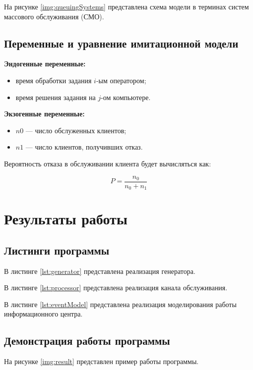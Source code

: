\documentclass{bmstu}
\begin{document}
На рисунке \ref{img:queuingSystems} представлена схема модели в терминах систем массового обслуживания (СМО).


\section{Переменные и уравнение имитационной модели}

\textbf{Эндогенные переменные:}

\begin{itemize}
    \item время обработки задания $i$-ым оператором;
    \item время решения задания на $j$-ом компьютере.
\end{itemize}

\textbf{Экзогенные переменные:}

\begin{itemize}
    \item $n0$ — число обслуженных клиентов;
    \item $n1$ — число клиентов, получивших отказ.
\end{itemize}

Вероятность отказа в обслуживании клиента будет вычисляться как:

\begin{equation}
    P = \frac{n_0}{n_0 + n_1}
\end{equation}

\chapter{Результаты работы}

\section{Листинги программы}

В листинге \ref{lst:generator} представлена реализация генератора.


В листинге \ref{lst:processor} представлена реализация канала обслуживания.


В листинге \ref{lst:eventModel} представлена реализация моделирования работы информационного центра.


\clearpage

\section{Демонстрация работы программы}

На рисунке \ref{img:result} представлен пример работы программы.

\end{document}
